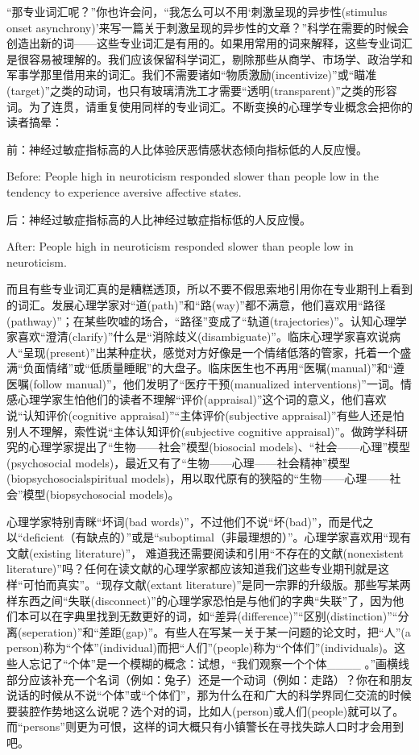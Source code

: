 “那专业词汇呢？”你也许会问，“我怎么可以不用‘刺激呈现的异步性(stimulus onset asynchrony)’来写一篇关于刺激呈现的异步性的文章？”科学在需要的时候会创造出新的词——这些专业词汇是有用的。如果用常用的词来解释，这些专业词汇是很容易被理解的。我们应该保留科学词汇，剔除那些从商学、市场学、政治学和军事学那里借用来的词汇。我们不需要诸如“物质激励(incentivize)”或“瞄准(target)”之类的动词，也只有玻璃清洗工才需要“透明(transparent)”之类的形容词。为了连贯，请重复使用同样的专业词汇。不断变换的心理学专业概念会把你的读者搞晕：

{\kaishu 前：神经过敏症指标高的人比体验厌恶情感状态倾向指标低的人反应慢。

Before: People high in neuroticism responded slower than people low in the tendency to experience aversive affective states.

后：神经过敏症指标高的人比神经过敏症指标低的人反应慢。

After: People high in neuroticism responded slower than people low in neuroticism.}

而且有些专业词汇真的是糟糕透顶，所以不要不假思索地引用你在专业期刊上看到的词汇。发展心理学家对“道(path)”和“路(way)”都不满意，他们喜欢用“路径(pathway)”；在某些吹嘘的场合，“路径”变成了“轨道(trajectories)”。认知心理学家喜欢“澄清(clarify)”什么是“消除歧义(disambiguate)”。临床心理学家喜欢说病人“呈现(present)”出某种症状，感觉对方好像是一个情绪低落的管家，托着一个盛满“负面情绪”或“低质量睡眠”的大盘子。临床医生也不再用“医嘱(manual)”和“遵医嘱(follow manual)”，他们发明了“医疗干预(manualized interventions)”一词。情感心理学家生怕他们的读者不理解“评价(appraisal)”这个词的意义，他们喜欢说“认知评价(cognitive appraisal)”“主体评价(subjective appraisal)”有些人还是怕别人不理解，索性说“主体认知评价(subjective cognitive appraisal)”。做跨学科研究的心理学家提出了“生物——社会”模型(biosocial models)、“社会——心理”模型(psychosocial models)，最近又有了“生物——心理——社会精神”模型(biopsychosocialspiritual models)，用以取代原有的狭隘的“生物——心理——社会”模型(biopsychosocial models)。

心理学家特别青眯“坏词(bad words)”，不过他们不说“坏(bad)”，而是代之以“deficient（有缺点的）”或是“suboptimal（非最理想的）”。心理学家喜欢用“现有文献(existing literature)”， 难道我还需要阅读和引用“不存在的文献(nonexistent literature)”吗？任何在读文献的心理学家都应该知道我们这些专业期刊就是这样“可怕而真实”。“现存文献(extant literature)”是同一宗罪的升级版。那些写某两样东西之间“失联(disconnect)”的心理学家恐怕是与他们的字典“失联”了，因为他们本可以在字典里找到无数更好的词，如“差异(difference)”“区别(distinction)”“分离(seperation)”和“差距(gap)”。有些人在写某一关于某一问题的论文时，把“人”(a person)称为“个体”(individual)而把“人们”(people)称为“个体们”(individuals)。这些人忘记了“个体”是一个模糊的概念：试想，“我们观察一个个体\_\_\_\_ 。”画横线部分应该补充一个名词（例如：兔子）还是一个动词（例如：走路）？你在和朋友说话的时候从不说“个体”或“个体们”，那为什么在和广大的科学界同仁交流的时候要装腔作势地这么说呢？选个对的词，比如人(person)或人们(people)就可以了。而“persons”则更为可恨，这样的词大概只有小镇警长在寻找失踪人口时才会用到吧。

